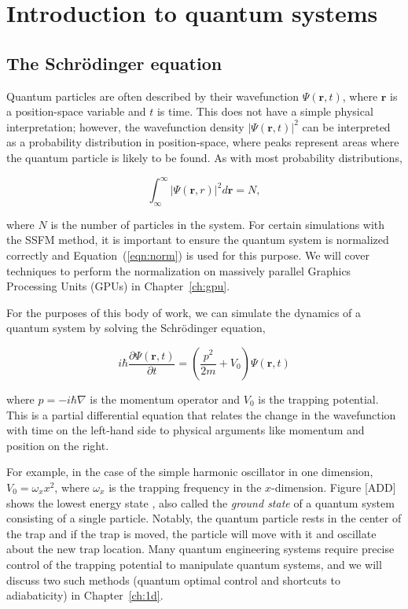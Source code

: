 \chapter{Introduction to quantum systems}
\label{ch:qs}

\section{The Schr\"odinger equation}
Quantum particles are often described by their wavefunction $\Psi(\mathbf{r},t)$, where $\mathbf{r}$ is a position-space variable and $t$ is time.
This does not have a simple physical interpretation; however, the wavefunction density $|\Psi(\mathbf{r},t)|^2$ can be interpreted as a probability distribution in position-space, where peaks represent areas where the quantum particle is likely to be found.
As with most probability distributions,

\begin{equation}
    \label{eqn:norm}
    \int_\infty^\infty |\Psi(\mathbf{r},r)|^2 d\mathbf{r} = N,
\end{equation}

\noindent where $N$ is the number of particles in the system.
For certain simulations with the SSFM method, it is important to ensure the quantum system is normalized correctly and Equation~(\ref{eqn:norm}) is used for this purpose.
We will cover techniques to perform the normalization on massively parallel Graphics Processing Units (GPUs) in Chapter~\ref{ch:gpu}.

For the purposes of this body of work, we can simulate the dynamics of a quantum system by solving the Schr\"odinger equation,

\begin{equation}
    i\hbar\frac{\partial\Psi(\mathbf{r},t)}{\partial t} = \left(\frac{p^2}{2m} + V_0\right) \Psi(\mathbf{r},t)
    \label{eqn:schrody}
\end{equation}

\noindent where $p = -i\hbar\nabla$ is the momentum operator and $V_0$ is the trapping potential.
This is a partial differential equation that relates the change in the wavefunction with time on the left-hand side to physical arguments like momentum and position on the right.

For example, in the case of the simple harmonic oscillator in one dimension, $V_0 = \omega_x x^2$, where $\omega_x$ is the trapping frequency in the $x$-dimension.
Figure [ADD] shows the lowest energy state , also called the \textit{ground state} of a quantum system consisting of a single particle.
Notably, the quantum particle rests in the center of the trap and if the trap is moved, the particle will move with it and oscillate about the new trap location.
Many quantum engineering systems require precise control of the trapping potential to manipulate quantum systems, and we will discuss two such methods (quantum optimal control and shortcuts to adiabaticity) in Chapter~\ref{ch:1d}.

